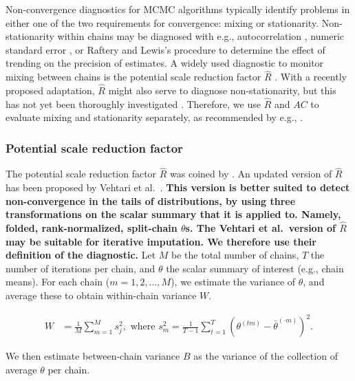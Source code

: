 \documentclass[Royal,times,sageh]{sagej}
\begin{document}
Non-convergence diagnostics for MCMC algorithms typically identify problems in either one of the two requirements for convergence: mixing or stationarity. Non-stationarity within chains may be diagnosed with e.g., autocorrelation \citep[\(AC\);][]{scha97, gelm13}, numeric standard error \citep[`MC error';][]{gewe92}, or Raftery and Lewis's \citeyearpar{raft91} procedure to determine the effect of trending on the precision of estimates. A widely used diagnostic to monitor mixing between chains is the potential scale reduction factor \(\widehat{R}\) \citep[`Gelman-Rubin statistic';][]{gelm92}. With a recently proposed adaptation, \(\widehat{R}\) might also serve to diagnose non-stationarity, but this has not yet been thoroughly investigated \citep{veht19}. Therefore, we use \(\widehat{R}\) and \(AC\) to evaluate mixing and stationarity separately, as recommended by e.g., \citet{cowl96}.

\hypertarget{potential-scale-reduction-factor}{%
\subsubsection{Potential scale reduction factor}\label{potential-scale-reduction-factor}}

The potential scale reduction factor \(\widehat{R}\) was coined by \citet{gelm92}. An updated version of \(\widehat{R}\) has been proposed by Vehtari et al.~\citeyearpar[p.~5]{veht19}. \textbf{This version is better suited to detect non-convergence in the tails of distributions, by using three transformations on the scalar summary that it is applied to. Namely, folded, rank-normalized, split-chain \(\theta\)s. The Vehtari et al.~version of \(\widehat{R}\) may be suitable for iterative imputation. We therefore use their definition of the diagnostic.} Let \(M\) be the total number of chains, \(T\) the number of iterations per chain, and \(\theta\) the scalar summary of interest (e.g., chain means). For each chain (\(m = 1, 2, \dots, M\)), we estimate the variance of \(\theta\), and average these to obtain within-chain variance \(W\).

\begin{align*}
W&=\frac{1}{M} \sum_{m=1}^{M} s_{j}^{2}, \text { where } s_{m}^{2}=\frac{1}{T-1} \sum_{t=1}^{T}\left(\theta^{(t m)}-\bar{\theta}^{(\cdot m)}\right)^{2}. 
\end{align*}

\noindent We then estimate between-chain variance \(B\) as the variance of the collection of average \(\theta\) per chain.
\end{document}
